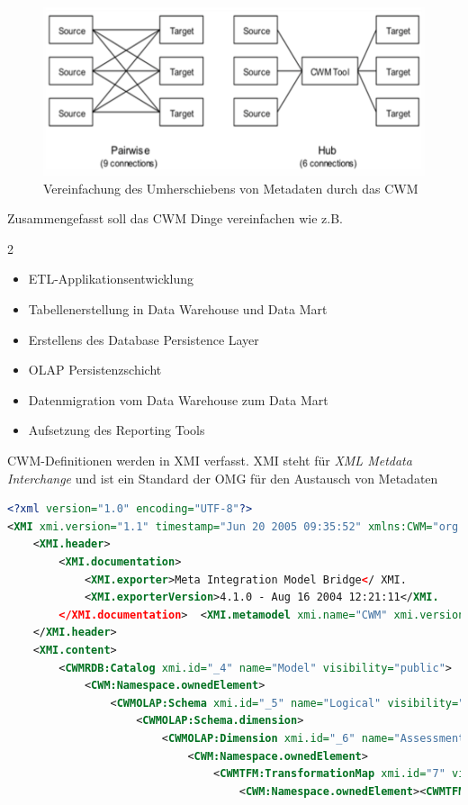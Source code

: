 \documentclass[a4paper, 11pt, nofootinbib]{article}
\begin{document}
\begin{figure}[htb]
	\centering
	\includegraphics[keepaspectratio=true,height=10\baselineskip]{CWM_schnittstellen.PNG}
	\caption{Vereinfachung des Umherschiebens von Metadaten durch das CWM}
	\label{fig:cwm_schittstellen}
\end{figure}


Zusammengefasst soll das CWM Dinge vereinfachen wie z.B.

\begin{multicols}{2}
	\begin{itemize}
		\item ETL-Applikationsentwicklung
		\item Tabellenerstellung in Data Warehouse und Data Mart
		\item Erstellens des Database Persistence Layer
		\item OLAP Persistenzschicht
		\item Datenmigration vom Data Warehouse zum Data Mart
		\item Aufsetzung des Reporting Tools
	\end{itemize}
\end{multicols}
\vspace{10px}

\noindent CWM-Definitionen werden in XMI verfasst. XMI steht für \textit{XML Metdata Interchange} und ist ein Standard der OMG für den Austausch von Metadaten

\begin{lstlisting}[language=xml, captionpos=b, caption={Ausschnitt einer Definition einer relationalen 'Administrations'-Tabelle}]
<?xml version="1.0" encoding="UTF-8"?> 
<XMI xmi.version="1.1" timestamp="Jun 20 2005 09:35:52" xmlns:CWM="org.omg.CWM1.0" xmlns:CWMRDB="org.omg.CWM1.0/ Relational" xmlns:CWMOLAP="Olap" xmlns:CWMTFM="Transformation">
	<XMI.header>
		<XMI.documentation>
			<XMI.exporter>Meta Integration Model Bridge</ XMI.
			<XMI.exporterVersion>4.1.0 - Aug 16 2004 12:21:11</XMI.
		</XMI.documentation>  <XMI.metamodel xmi.name="CWM" xmi.version="1.0"/>
	</XMI.header>
	<XMI.content>
		<CWMRDB:Catalog xmi.id="_4" name="Model" visibility="public">
			<CWM:Namespace.ownedElement>
				<CWMOLAP:Schema xmi.id="_5" name="Logical" visibility="public" namespace="_4">
					<CWMOLAP:Schema.dimension>    
						<CWMOLAP:Dimension xmi.id="_6" name="Assessment Summary" visibility="public" schema="_2">
							<CWM:Namespace.ownedElement>
								<CWMTFM:TransformationMap xmi.id="7" visibility="public" namespace="_6">
									<CWM:Namespace.ownedElement><CWMTFM:ClassifierMap xmi.id="_8" name="unnamed_8" visibility="public" namespace="7" transformationMap="7">
\end{lstlisting}
\end{document}
